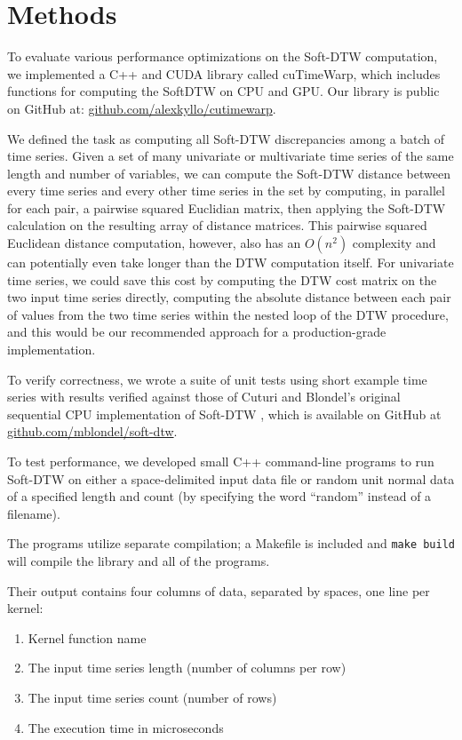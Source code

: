 \documentclass[12pt, letterpaper]{article}
\begin{document}
\section{Methods}

To evaluate various performance optimizations on the Soft-DTW computation, we
implemented a C++ and CUDA library called cuTimeWarp, which includes functions
for computing the SoftDTW on CPU and GPU. Our library is public on GitHub at:
\href{https://github.com/alexkyllo/cutimewarp}{github.com/alexkyllo/cutimewarp}.

We defined the task as computing all Soft-DTW discrepancies among a batch of
time series. Given a set of many univariate or multivariate time series of the
same length and number of variables, we can compute the Soft-DTW distance
between every time series and every other time series in the set by computing,
in parallel for each pair, a pairwise squared Euclidian matrix, then applying
the Soft-DTW calculation on the resulting array of distance matrices. This
pairwise squared Euclidean distance computation, however, also has an $O(n^2)$
complexity and can potentially even take longer than the DTW computation
itself. For univariate time series, we could save this cost by computing the DTW
cost matrix on the two input time series directly, computing the absolute
distance between each pair of values from the two time series within the nested
loop of the DTW procedure, and this would be our recommended approach for a
production-grade implementation.

To verify correctness, we wrote a suite of unit tests using short example time
series with results verified against those of Cuturi and Blondel's original
sequential CPU implementation of Soft-DTW \cite{cuturi_soft-dtw_2018}, which is
available on GitHub at
\href{https://github.com/mblondel/soft-dtw}{github.com/mblondel/soft-dtw}.

To test performance, we developed small C++ command-line programs to run
Soft-DTW on either a space-delimited input data file or random unit normal data
of a specified length and count (by specifying the word ``random'' instead of a
filename).

The programs utilize separate compilation; a Makefile is included and
\verb|make build| will compile the library and all of the programs.

Their output contains four columns of data, separated by spaces, one line per
kernel:

\begin{enumerate}
  \item Kernel function name
  \item The input time series length (number of columns per row)
  \item The input time series count (number of rows)
  \item The execution time in microseconds
\end{enumerate}
\end{document}
